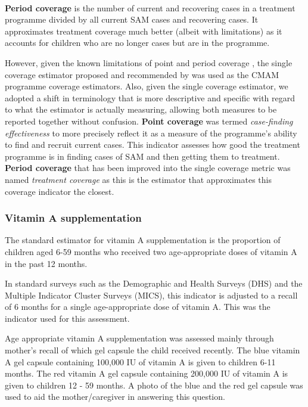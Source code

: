 \documentclass[12pt,a4paper]{article}
\begin{document}
~

\textbf{Period coverage} is the number of current and recovering cases in a treatment programme divided by all current SAM cases and recovering cases. It approximates treatment coverage much better (albeit with limitations) as it accounts for children who are no longer cases but are in the programme.

However, given the known limitations of point and period coverage \citep{Myatt:2012tt}, the single coverage estimator proposed and recommended by \citet{Balegamire:2015ud} was used as the CMAM programme coverage estimators. Also, given the single coverage estimator, we adopted a shift in terminology that is more descriptive and specific with regard to what the estimator is actually measuring, allowing both measures to be reported together without confusion. \textbf{Point coverage} was termed \emph{case-finding effectiveness} to more precisely reflect it as a measure of the programme's ability to find and recruit current cases. This indicator assesses how good the treatment programme is in finding cases of SAM and then getting them to treatment. \textbf{Period coverage} that has been improved into the single coverage metric was named \emph{treatment coverage} as this is the estimator that approximates this coverage indicator the closest.

\hypertarget{vitamin-a-supplementation}{%
\subsubsection{Vitamin A supplementation}\label{vitamin-a-supplementation}}

The standard estimator for vitamin A supplementation is the proportion of children aged 6-59 months who received two age-appropriate doses of vitamin A in the past 12 months.

In standard surveys such as the Demographic and Health Surveys (DHS) and the Multiple Indicator Cluster Surveys (MICS), this indicator is adjusted to a recall of 6 months for a single age-appropriate dose of vitamin A. This was the indicator used for this assessment.

Age appropriate vitamin A supplementation was assessed mainly through mother's recall of which gel capsule the child received recently. The blue vitamin A gel capsule containing 100,000 IU of vitamin A is given to children 6-11 months. The red vitamin A gel capsule containing 200,000 IU of vitamin A is given to children 12 - 59 months. A photo of the blue and the red gel capsule was used to aid the mother/caregiver in answering this question.
\end{document}
